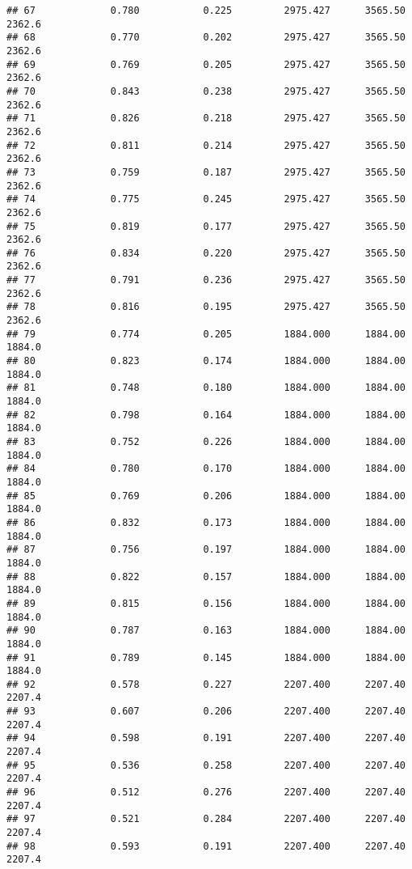 \documentclass[
]{article}
\begin{document}
\begin{verbatim}
## 67             0.780           0.225         2975.427      3565.50       2362.6
## 68             0.770           0.202         2975.427      3565.50       2362.6
## 69             0.769           0.205         2975.427      3565.50       2362.6
## 70             0.843           0.238         2975.427      3565.50       2362.6
## 71             0.826           0.218         2975.427      3565.50       2362.6
## 72             0.811           0.214         2975.427      3565.50       2362.6
## 73             0.759           0.187         2975.427      3565.50       2362.6
## 74             0.775           0.245         2975.427      3565.50       2362.6
## 75             0.819           0.177         2975.427      3565.50       2362.6
## 76             0.834           0.220         2975.427      3565.50       2362.6
## 77             0.791           0.236         2975.427      3565.50       2362.6
## 78             0.816           0.195         2975.427      3565.50       2362.6
## 79             0.774           0.205         1884.000      1884.00       1884.0
## 80             0.823           0.174         1884.000      1884.00       1884.0
## 81             0.748           0.180         1884.000      1884.00       1884.0
## 82             0.798           0.164         1884.000      1884.00       1884.0
## 83             0.752           0.226         1884.000      1884.00       1884.0
## 84             0.780           0.170         1884.000      1884.00       1884.0
## 85             0.769           0.206         1884.000      1884.00       1884.0
## 86             0.832           0.173         1884.000      1884.00       1884.0
## 87             0.756           0.197         1884.000      1884.00       1884.0
## 88             0.822           0.157         1884.000      1884.00       1884.0
## 89             0.815           0.156         1884.000      1884.00       1884.0
## 90             0.787           0.163         1884.000      1884.00       1884.0
## 91             0.789           0.145         1884.000      1884.00       1884.0
## 92             0.578           0.227         2207.400      2207.40       2207.4
## 93             0.607           0.206         2207.400      2207.40       2207.4
## 94             0.598           0.191         2207.400      2207.40       2207.4
## 95             0.536           0.258         2207.400      2207.40       2207.4
## 96             0.512           0.276         2207.400      2207.40       2207.4
## 97             0.521           0.284         2207.400      2207.40       2207.4
## 98             0.593           0.191         2207.400      2207.40       2207.4

\end{verbatim}
\end{document}
